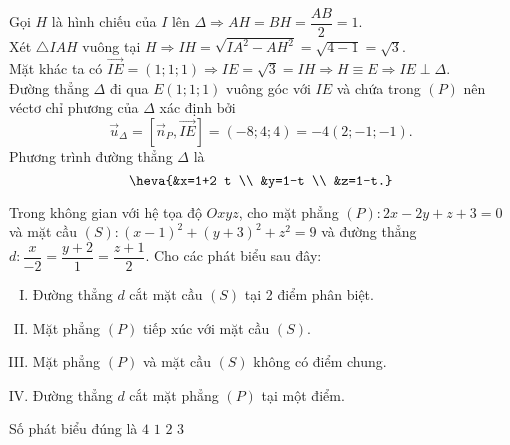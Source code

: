 \begin{ex}
{	Gọi $H$ là hình chiếu của $I$ lên $\Delta \Rightarrow A H=B H=\dfrac{A B}{2}=1$.\\
	Xét $\triangle I A H$ vuông tại $H \Rightarrow I H=\sqrt{I A^2-A H^2}=\sqrt{4-1}=\sqrt{3}$.\\
	Mặt khác ta có $\overrightarrow{I E}=(1; 1; 1) \Rightarrow I E=\sqrt{3}=I H \Rightarrow H \equiv E \Rightarrow I E \perp \Delta$.\\
	Đường thẳng $\Delta$ đi qua $E(1; 1; 1)$ vuông góc với $I E$ và chứa trong $(P)$ nên	véctơ chỉ phương của $\Delta$ xác định bởi $$\overrightarrow{u}_{\Delta}=\left[\overrightarrow{n}_P, \overrightarrow{I E}\right]=(-8; 4; 4)=-4(2;-1;-1).$$
	Phương trình đường thẳng $\Delta$ là $$\heva{&x=1+2 t \\ &y=1-t \\ &z=1-t.}$$	
	}
\end{ex}
\begin{ex}%
	Trong không gian với hệ tọa độ $O x y z$, cho mặt phẳng $(P)\colon 2 x-2 y+z+3=0$ và mặt cầu $(S)\colon(x-1)^2+(y+3)^2+z^2=9$ và đường thẳng $d\colon \dfrac{x}{-2}=\dfrac{y+2}{1}=\dfrac{z+1}{2}$. Cho các phát biểu sau đây:
	\begin{enumerate}[I. ]
	\item Đường thẳng $d$ cắt mặt cầu $(S)$ tại 2 điểm phân biệt.
	\item Mặt phẳng $(P)$ tiếp xúc với mặt cầu $(S)$.
	\item Mặt phẳng $(P)$ và mặt cầu $(S)$ không có điểm chung.
	\item Đường thẳng $d$ cắt mặt phẳng $(P)$ tại một điểm.	
	\end{enumerate}
	Số phát biểu đúng là
	\choice
	{$4$}
	{$1$}
	{$2$}
	{\True $3$}
\end{ex} 

